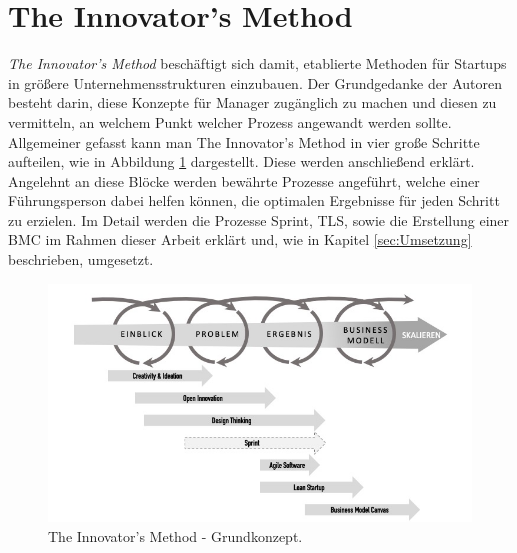 \section{The Innovator's Method}
\label{sec:TheInnovatorsMethod}
\textit{The Innovator's Method} beschäftigt sich damit, etablierte Methoden für Startups in größere Unternehmensstrukturen einzubauen. Der Grundgedanke der Autoren \citeauthor{TheInnovatorsMethod} besteht darin, diese Konzepte für Manager zugänglich zu machen und diesen zu vermitteln, an welchem Punkt welcher Prozess angewandt werden sollte. Allgemeiner gefasst kann man The Innovator's Method in vier große Schritte aufteilen, wie in Abbildung \ref{fig:TheInnovatorsMethod} dargestellt. Diese werden anschließend erklärt. Angelehnt an diese Blöcke werden bewährte Prozesse angeführt, welche einer Führungsperson dabei helfen können, die optimalen Ergebnisse für jeden Schritt zu erzielen.
Im Detail werden die Prozesse Sprint, \ac{TLS}, sowie die Erstellung einer \ac{BMC} im Rahmen dieser Arbeit erklärt und, wie in Kapitel \ref{sec:Umsetzung} beschrieben, umgesetzt.

\begin{figure}[h!]
	\begin{center}
		\includegraphics[width=\textwidth]{99_IMG/02_Grundlagen/innovatorsMethod.jpg}
		\caption{The Innovator's Method - Grundkonzept.}
		\label{fig:TheInnovatorsMethod}
	\end{center}
\end{figure}

